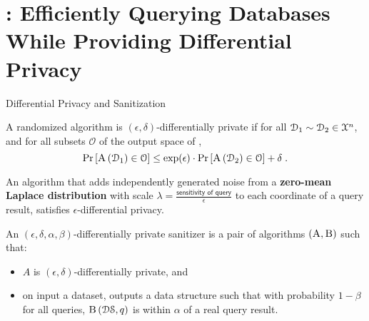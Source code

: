 \section{\epsolute{}: Efficiently Querying Databases While Providing Differential Privacy~\cite{epsolute}}

	\begin{frame}{Differential Privacy and Sanitization}

		\begin{definition}
			\justify%

			A randomized algorithm  is $(\epsilon, \delta)$-differentially private if for all $\mathcal{D}_1 \sim \mathcal{D}_2 \in \mathcal{X}^{n}$, and for all subsets $\mathcal{O}$ of the output space of ,
			\[
				\probability{ \algo{A}{ \database_1 } \in \mathcal{O} } \leq \exp(\epsilon) \cdot \probability{ \algo{A}{ \database_2 } \in \mathcal{O} } + \delta \; .
			\]
		\end{definition}

		\pause%

		\begin{theorem}
			\justify%

			An algorithm  that adds independently generated noise from a \textbf{zero-mean Laplace distribution} with scale $\lambda = \frac{\textsf{sensitivity of query}}{\epsilon}$ to each coordinate of a query result, satisfies $\epsilon$-differential privacy.
		\end{theorem}

		\pause%

		\begin{definition}
			\justify%

			An $(\epsilon, \delta, \alpha, \beta)$-differentially private sanitizer is a pair of algorithms $(\algo{A}, \algo{B})$ such that:
			\begin{itemize}
				\item $A$ is $(\epsilon, \delta)$-differentially private, and
				\item on input a dataset,  outputs a data structure \serverDS{} such that with probability $1 - \beta$ for all queries, $\algo{B}{ \serverDS, \query }$ is within $\alpha$ of a real query result.
			\end{itemize}
		\end{definition}

	\end{frame}

